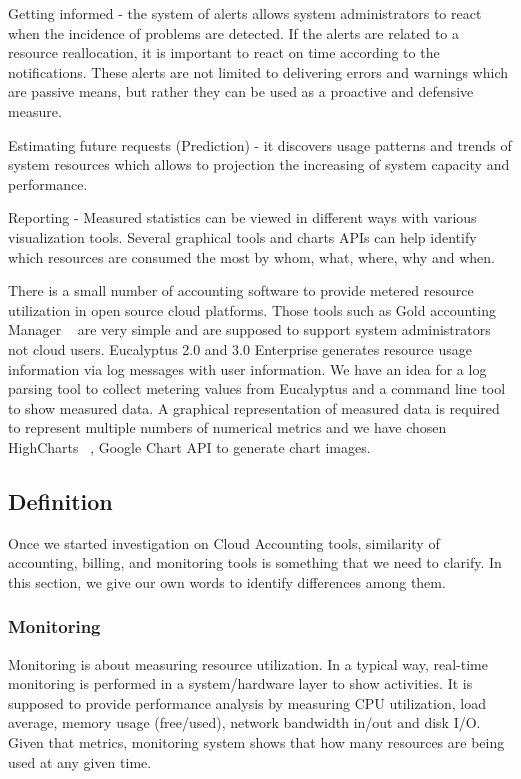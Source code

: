 \documentclass{sig-alternate}
\begin{document}
Getting informed - the system of alerts allows system administrators to react when the incidence of problems are detected. If the alerts are related to a resource reallocation, it is important to react on time according to the notifications. These alerts are not limited to delivering errors and warnings which are passive means, but rather they can be used as a proactive and defensive measure. 

Estimating future requests (Prediction) - it discovers usage patterns and trends of system resources which allows to projection the increasing of system capacity and performance. 

Reporting - Measured statistics can be viewed in different ways with various visualization tools. Several graphical tools and charts APIs can help identify which resources are consumed the most by whom, what, where, why and when. 

There is a small number of accounting software to provide metered resource utilization in open source cloud platforms. Those tools such as Gold accounting Manager ~\cite{jacksongold} are very simple and are supposed to support system administrators not cloud users. Eucalyptus 2.0 and 3.0 Enterprise generates resource usage information via log messages with user information. We have an idea for a log parsing tool to collect metering values from Eucalyptus and a command line tool to show measured data. A graphical representation of measured data is required to represent multiple numbers of numerical metrics and we have chosen HighCharts ~\cite{highsoft2012highcharts}, Google Chart API to generate chart images.

\subsection{Definition}

Once we started investigation on Cloud Accounting tools, similarity of accounting, billing, and monitoring tools is something that we need to clarify. In this section, we give our own words to identify differences among them. 

\subsubsection{Monitoring}

Monitoring is about measuring resource utilization. In a typical way, real-time monitoring is performed in a system/hardware layer to show activities. It is supposed to provide performance analysis by measuring CPU utilization, load average, memory usage (free/used), network bandwidth in/out and disk I/O. Given that metrics, monitoring system shows that how many resources are being used at any given time. 
\end{document}
